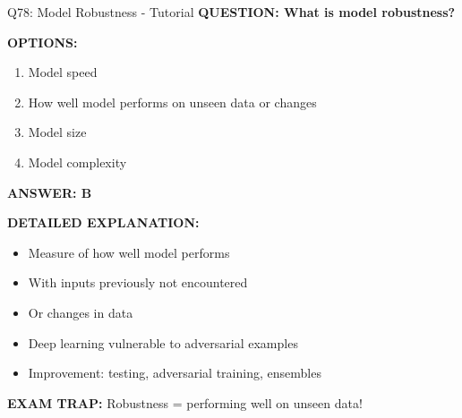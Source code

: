 \documentclass[8pt]{beamer}
\begin{document}
	\begin{frame}{Q78: Model Robustness - Tutorial}
		\fontsize{6.5}{7.5}\selectfont
		\textbf{QUESTION: What is model robustness?}
		
		\vspace{0.1cm}
		\textbf{OPTIONS:}
		\begin{enumerate}
			\item Model speed
			\item How well model performs on unseen data or changes
			\item Model size
			\item Model complexity
		\end{enumerate}
		
		\vspace{0.1cm}
		\textcolor{myblue}{\textbf{ANSWER: B}}
		
		\vspace{0.1cm}
		\textbf{DETAILED EXPLANATION:}
		\begin{itemize}
			\item Measure of how well model performs
			\item With inputs previously not encountered
			\item Or changes in data
			\item Deep learning vulnerable to adversarial examples
			\item Improvement: testing, adversarial training, ensembles
		\end{itemize}
		
		\vspace{0.1cm}
		\textcolor{myred}{\textbf{EXAM TRAP:}} Robustness = \textcolor{myblue}{performing well on unseen data}!
	\end{frame}
	
\end{document}
